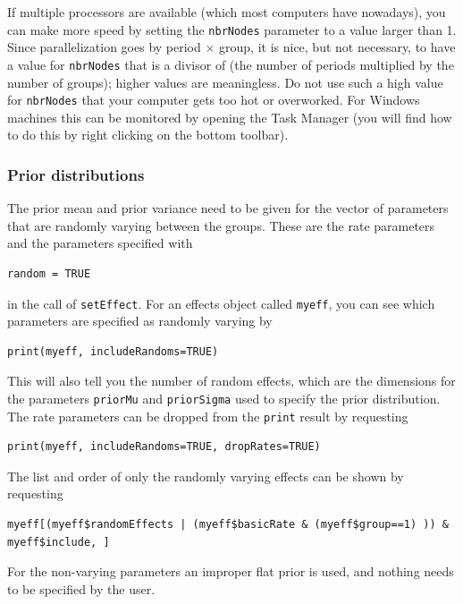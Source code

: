\documentclass[a4paper,fleqn,11pt]{article}
\newcommand{\+}{\, + \,}
\begin{document}
If multiple processors are available (which most computers have nowadays),
you can make more speed by setting the \texttt{nbrNodes} parameter to a value
larger than 1. Since parallelization goes by period $\times$ group,
it is nice, but not necessary, to have a value for \texttt{nbrNodes} that
is a divisor of (the number of periods multiplied by the number of groups);
higher values are meaningless.
Do not use such a high value for \texttt{nbrNodes} that your computer gets too
 hot or overworked. For Windows machines this can be monitored by opening
 the Task Manager (you will find how to do this by right clicking on the bottom
 toolbar).

\subsubsection{Prior distributions}

The prior mean and prior variance need to be given for the vector of parameters
that are randomly varying between the groups.
These are the rate parameters and the parameters specified with
\begin{verbatim}
random = TRUE
\end{verbatim}
in the call of \texttt{setEffect}.
For an effects object called \texttt{myeff}, you can see which
parameters are specified as randomly varying by
\begin{verbatim}
print(myeff, includeRandoms=TRUE)
\end{verbatim}
This will also tell you the number of random effects, which are the
dimensions for the parameters \texttt{priorMu} and  \texttt{priorSigma}
used to specify the prior distribution.
The rate parameters can be dropped from the \texttt{print} result
by requesting
\begin{verbatim}
print(myeff, includeRandoms=TRUE, dropRates=TRUE)
\end{verbatim}
The list and order of only the randomly varying effects
can be shown by requesting
{\small
\begin{verbatim}
myeff[(myeff$randomEffects | (myeff$basicRate & (myeff$group==1) )) & myeff$include, ]
\end{verbatim}
}
\smallskip

For the non-varying parameters an improper flat prior is used,
and nothing needs to be specified by the user.
\smallskip
\end{document}
